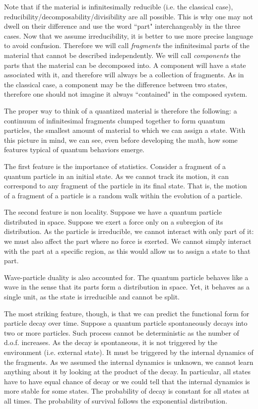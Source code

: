 \documentclass[smallextended]{svjour3}
\numberwithin{equation}{section}
\theoremstyle{definition}
\begin{document}
Note that if the material is infinitesimally reducible (i.e. the classical case), reducibility/decomposability/divisibility are all possible. This is why one may not dwell on their difference and use the word ``part" interchangeably in the three cases. Now that we assume irreducibility, it is better to use more precise language to avoid confusion. Therefore we will call \emph{fragments} the infinitesimal parts of the material that cannot be described independently. We will call \emph{components} the parts that the material can be decomposed into. A component will have a state associated with it, and therefore will always be a collection of fragments. As in the classical case, a component may be the difference between two states, therefore one should not imagine it always ``contained" in the composed system.

The proper way to think of a quantized material is therefore the following: a continuum of infinitesimal fragments clumped together to form quantum particles, the smallest amount of material to which we can assign a state. With this picture in mind, we can see, even before developing the math, how some features typical of quantum behaviors emerge.

The first feature is the importance of statistics. Consider a fragment of a quantum particle in an initial state. As we cannot track its motion, it can correspond to any fragment of the particle in its final state. That is, the motion of a fragment of a particle is a random walk within the evolution of a particle.

The second feature is non locality. Suppose we have a quantum particle distributed in space. Suppose we exert a force only on a subregion of its distribution. As the particle is irreducible, we cannot interact with only part of it: we must also affect the part where no force is exerted. We cannot simply interact with the part at a specific region, as this would allow us to assign a state to that part.

Wave-particle duality is also accounted for. The quantum particle behaves like a wave in the sense that its parts form a distribution in space. Yet, it behaves as a single unit, as the state is irreducible and cannot be split.

The most striking feature, though, is that we can predict the functional form for particle decay over time. Suppose a quantum particle spontaneously decays into two or more particles. Such process cannot be deterministic as the number of d.o.f. increases. As the decay is spontaneous, it is not triggered by the environment (i.e. external state). It must be triggered by the internal dynamics of the fragments. As we assumed the internal dynamics is unknown, we cannot learn anything about it by looking at the product of the decay. In particular, all states have to have equal chance of decay or we could tell that the internal dynamics is more stable for some states. The probability of decay is constant for all states at all times. The probability of survival follows the exponential distribution.
\end{document}

